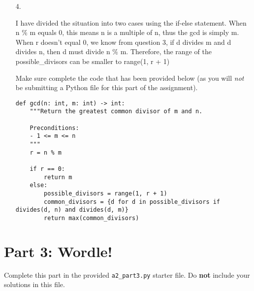 \documentclass[11pt]{article}
\begin{document}
\begin{enumerate}
\begin{proof}
\end{proof}

\item[4.]

I have divided the situation into two cases using the if-else statement. When n $\%$ m equals 0, this means n is a multiple of n, thus the gcd is simply m. When r doesn't equal 0, we know from question 3, if d divides m and d divides n, then d must divide n $\%$ m. Therefore, the range of the possible\_divisors can be smaller to range(1, r + 1)

Make sure complete the code that has been provided below (as you will \emph{not} be submitting a Python file for this part of the assignment).

\begin{verbatim}
def gcd(n: int, m: int) -> int:
    """Return the greatest common divisor of m and n.

    Preconditions:
    - 1 <= m <= n
    """
    r = n % m

    if r == 0:
        return m
    else:
        possible_divisors = range(1, r + 1)
        common_divisors = {d for d in possible_divisors if divides(d, n) and divides(d, m)}
        return max(common_divisors)
\end{verbatim}
\end{enumerate}



\section*{Part 3: Wordle!}

Complete this part in the provided \texttt{a2\_part3.py} starter file.
Do \textbf{not} include your solutions in this file.
\end{document}
